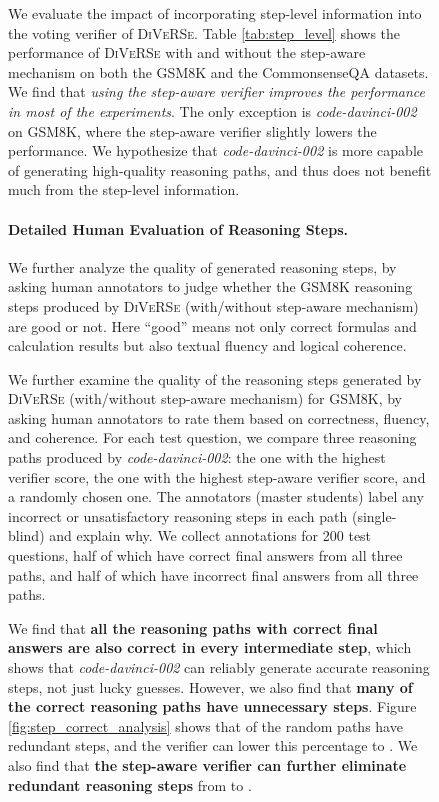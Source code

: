 \documentclass[11pt,a4paper]{article}
\begin{document}
\begin{figure}[t]
\begin{tcolorbox}[colback=blue!5!white,colframe=blue!75!black,title=Chain-Of-Thought Reasoning for GSM8K Math Word Problem,fontupper=\footnotesize,fonttitle=\scriptsize]
We evaluate the impact of incorporating step-level information into the voting verifier of \textsc{DiVeRSe}.
Table \ref{tab:step_level} shows the performance of \textsc{DiVeRSe} with and without the step-aware mechanism on both the GSM8K  and the CommonsenseQA datasets.
We find that \emph{using the step-aware verifier improves the performance in most of the experiments}.
The only exception is \emph{code-davinci-002} on GSM8K, where the step-aware verifier slightly lowers the performance.
We hypothesize that \emph{code-davinci-002} is more capable of generating high-quality reasoning paths, and thus does not benefit much from the step-level information.

\paragraph{Detailed Human Evaluation of Reasoning Steps.}
We further analyze the quality of generated reasoning steps, by asking human annotators to judge whether the GSM8K reasoning steps produced by \textsc{DiVeRSe} (with/without step-aware mechanism) are good or not.
Here ``good'' means not only correct formulas and calculation results but also textual fluency and logical coherence.



We further examine the quality of the reasoning steps generated by \textsc{DiVeRSe} (with/without step-aware mechanism) for GSM8K, by asking human annotators to rate them based on correctness, fluency, and coherence.
For each test question, we compare three reasoning paths produced by \textit{code-davinci-002}: the one with the highest verifier score, the one with the highest step-aware verifier score, and a randomly chosen one.
The annotators (master students) label any incorrect or unsatisfactory reasoning steps in each path (single-blind) and explain why.
We collect annotations for 200 test questions, half of which have correct final answers from all three paths, and half of which have incorrect final answers from all three paths.





We find that \textbf{all the reasoning paths with correct final answers are also correct in every intermediate step}, which shows that \textit{code-davinci-002} can reliably generate accurate reasoning steps, not just lucky guesses.
However, we also find that \textbf{many of the correct reasoning paths have unnecessary steps}.
Figure \ref{fig:step_correct_analysis} shows that  of the random paths have redundant steps, and the verifier can lower this percentage to .
We also find that \textbf{the step-aware verifier can further eliminate redundant reasoning steps} from  to .




\end{tcolorbox}
\end{figure}
\end{document}
